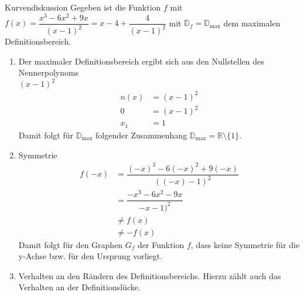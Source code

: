  \begin{bsp}{Kurvendiskussion}{}
Gegeben ist die Funktion $f$ mit $f(x) = \dfrac{x^3-6x^2+9x}{(x-1)^2} = x-4+\dfrac{4}{(x-1)^2}$ mit $\mathds{D}_f = \mathds{D}_{\text{max}}$ dem maximalen Definitionsbereich. 
 \begin{enumerate}
     \item Der maximaler Definitionsbereich ergibt sich aus den Nullstellen des Nennerpolynoms\\ $(x-1)^2$
     \begin{equation*}
    \begin{split}
        n(x) &= (x-1)^2 \\
        0&= (x-1)^2\\
        x_{1} &= 1    
    \end{split}
\end{equation*}
Damit folgt für $\mathds{D}_{\text{max}}$ folgender Zusammenhang $\mathds{D}_{\text{max}} = \mathds{R}\setminus\{1\}$.
\item Symmetrie
\begin{equation*}
    \begin{split}
        f(-x) &= \dfrac{(-x)^3-6(-x)^2+9(-x)}{((-x)-1)^2} \\
        &= \dfrac{-x^3-6x^2-9x}{-x-1)^2}\\
         &\neq  f(x)\\
         &\neq -f(x)
    \end{split}
\end{equation*}
Damit folgt für den Graphen $G_f$ der Funktion $f$, dass keine Symmetrie für die y-Achse bzw. für den Ursprung vorliegt.
 \item Verhalten an den Rändern des Definitionsbereichs. Hierzu zählt auch das Verhalten an der Definitionslücke.


\end{enumerate}
\end{bsp}
